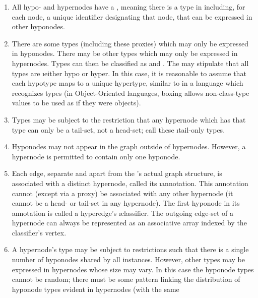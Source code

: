 {\begin{enumerate}
unwarranted to assume (without type-level semantics) that two equatable
hypernodes in different graphs are or are not inferentially equivalent.
Conversely, even if graphs are uniquely labeled \mdash{} which would
appear to enable a formal distinction between hypernodes in one
graph from those in another, \CH{}
semantics does not permit the assumption that this separation alone
justifies inferences presupposing that their hypernodes
\i{are not} inferentially equivalent.
\item{}  All hypo- and hypernodes have a , meaning there is a type in
\TyS{} including, for each node, a unique identifier designating
that node, that can be expressed in other hyponodes.
\item{}  There are some types (including these proxies) which may only be expressed
in hyponodes.  There may be other types which may only be expressed
in hypernodes.  Types can then be classified as  and .
The \TyS{} may stipulate that all types are \i{either} hypo or hyper.  In
this case, it is reasonable to assume that each hypotype maps to a unique
hypertype, similar to  in a language which recognizes 
types (in Object-Oriented languages, boxing allows non-class-type
values to be used as if they were objects).
\item{}  Types may be subject to the restriction that any hypernode which has that
type can only be a tail-set, not a head-set; call these \i{tail-only} types.
\item{}  Hyponodes may not appear in the graph outside of hypernodes.  However, a
hypernode is permitted to contain only one hyponode.
\item{}  Each edge, separate and apart from the \CH{}'s actual graph structure,
is associated with a distinct hypernode, called its \i{annotation}.  This
annotation cannot (except via a proxy) be associated with any other hypernode
(it cannot be a head- or tail-set in any hypernode).
The first hyponode in its annotation is
called a hyperedge's \i{classifier}.  The outgoing edge-set of a hypernode can
always be represented as an associative array indexed by the classifier's vertex.
\item{}  A hypernode's type may be subject to restrictions such that there is a
single number of hyponodes shared by all instances.  However, other types may be
expressed in hypernodes whose size may vary.  In this case the
hyponode types cannot be random; there must be some pattern linking
the distribution of hyponode types evident in hypernodes (with the same

\end{enumerate}}

